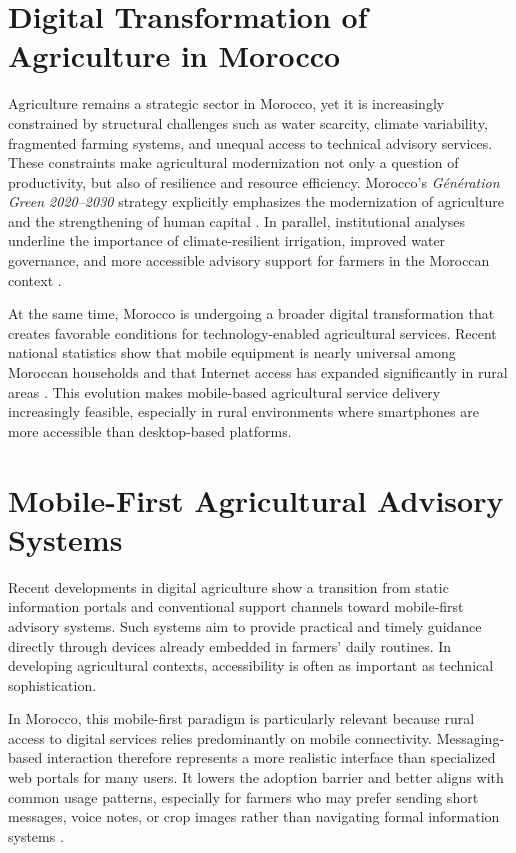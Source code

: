 \section{Digital Transformation of Agriculture in Morocco}

Agriculture remains a strategic sector in Morocco, yet it is increasingly constrained by structural challenges such as water scarcity, climate variability, fragmented farming systems, and unequal access to technical advisory services. These constraints make agricultural modernization not only a question of productivity, but also of resilience and resource efficiency. Morocco's \textit{Génération Green 2020--2030} strategy explicitly emphasizes the modernization of agriculture and the strengthening of human capital \cite{generationgreen2020}. In parallel, institutional analyses underline the importance of climate-resilient irrigation, improved water governance, and more accessible advisory support for farmers in the Moroccan context \cite{worldbank2024irrigation}.

At the same time, Morocco is undergoing a broader digital transformation that creates favorable conditions for technology-enabled agricultural services. Recent national statistics show that mobile equipment is nearly universal among Moroccan households and that Internet access has expanded significantly in rural areas \cite{anrt2025}. This evolution makes mobile-based agricultural service delivery increasingly feasible, especially in rural environments where smartphones are more accessible than desktop-based platforms.

\section{Mobile-First Agricultural Advisory Systems}

Recent developments in digital agriculture show a transition from static information portals and conventional support channels toward mobile-first advisory systems. Such systems aim to provide practical and timely guidance directly through devices already embedded in farmers' daily routines. In developing agricultural contexts, accessibility is often as important as technical sophistication.

In Morocco, this mobile-first paradigm is particularly relevant because rural access to digital services relies predominantly on mobile connectivity. Messaging-based interaction therefore represents a more realistic interface than specialized web portals for many users. It lowers the adoption barrier and better aligns with common usage patterns, especially for farmers who may prefer sending short messages, voice notes, or crop images rather than navigating formal information systems \cite{anrt2025}.

